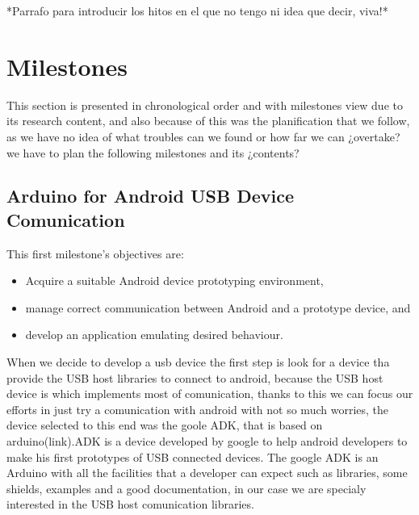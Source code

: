 	*Parrafo para introducir los hitos en el que no tengo ni idea que decir, viva!*	
	
	\section{Milestones}	
	This section is presented in chronological order and with milestones view due to its research content, and also because of this was the planification that we follow, as we have no idea of what troubles can we found or how far we can ¿overtake? we have to plan the following milestones and its ¿contents?%



		\subsection{Arduino for Android USB Device Comunication}
		This first milestone's objectives are:
		\begin{itemize}
		\item Acquire a suitable Android device prototyping environment, 
		\item manage correct communication between Android and a prototype device, and
		\item develop an application emulating desired behaviour.
		\end{itemize}
		When we decide to develop a usb device the first step is look for a device tha provide the USB host libraries to connect to android, because the USB host device is which implements most of comunication, thanks to this we can focus our efforts in just try a comunication with android with not so much worries, the device selected to this end was the goole ADK, that is based on arduino(link).ADK is a device developed by google to help android developers to make his first prototypes of USB connected devices. The google ADK is an Arduino with all the facilities that a developer can expect such as libraries, some shields, examples and a good documentation, in our case we are specialy interested in the USB host comunication libraries.\\

